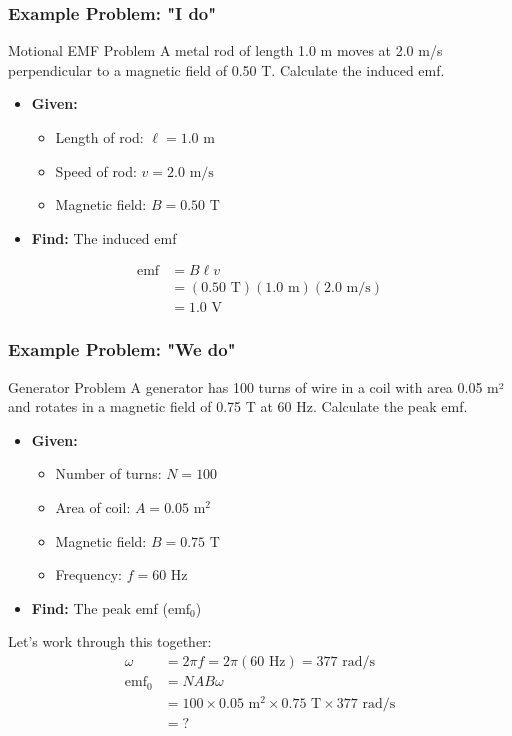 \documentclass{beamer}
\begin{document}
\begin{frame}
\frametitle{Example Problem: "I do"}
\begin{block}{Motional EMF Problem}
A metal rod of length 1.0 m moves at 2.0 m/s perpendicular to a magnetic field of 0.50 T. Calculate the induced emf.
\end{block}

\begin{itemize}
\item \textbf{Given:}
\begin{itemize}
    \item Length of rod: $\ell = 1.0 \text{ m}$
    \item Speed of rod: $v = 2.0 \text{ m/s}$
    \item Magnetic field: $B = 0.50 \text{ T}$
\end{itemize}
\item \textbf{Find:} The induced emf
\end{itemize}

\pause

\begin{align}
\text{emf} &= B\ell v \\
&= (0.50 \text{ T})(1.0 \text{ m})(2.0 \text{ m/s}) \\
&= 1.0 \text{ V}
\end{align}


\end{frame}

\begin{frame}
\frametitle{Example Problem: "We do"}
\begin{block}{Generator Problem}
A generator has 100 turns of wire in a coil with area 0.05 m² and rotates in a magnetic field of 0.75 T at 60 Hz. Calculate the peak emf.
\end{block}

\begin{itemize}
\item \textbf{Given:}
\begin{itemize}
    \item Number of turns: $N = 100$
    \item Area of coil: $A = 0.05 \text{ m}^2$
    \item Magnetic field: $B = 0.75 \text{ T}$
    \item Frequency: $f = 60 \text{ Hz}$
\end{itemize}
\item \textbf{Find:} The peak emf ($\text{emf}_0$)
\end{itemize}

Let's work through this together:
\begin{align}
\omega &= 2\pi f = 2\pi(60 \text{ Hz}) = 377 \text{ rad/s} \\
\text{emf}_0 &= NAB\omega \\
&= 100 \times 0.05 \text{ m}^2 \times 0.75 \text{ T} \times 377 \text{ rad/s} \\
&= ?
\end{align}
\end{frame}
\end{document}
